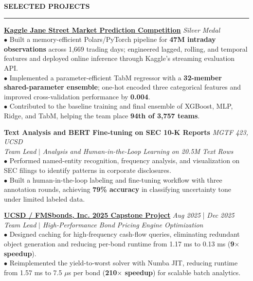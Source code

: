 \documentclass{../original_CV/resume}
\renewcommand{\sectionskip}{\vspace{0.10cm}}
\renewcommand{\sectionlineskip}{\vspace{0.10cm}}
\renewenvironment{rSection}[1]{
\sectionskip
\textcolor{UC San Diego Blue}{\textbf{\large\bfseries\MakeUppercase{#1}}}
\sectionlineskip
\hrule
\begin{list}{}{
\setlength{\leftmargin}{0em}
}
\item[]
}{
\end{list}
}
\begin{document}
\begin{rSection}{SELECTED PROJECTS}
\noindent
\href{https://github.com/YuankaiTao-super/Kaggle2024-Jane-Street-Real-Time-Market-Data-Forecasting}{\textbf{Kaggle Jane Street Market Prediction Competition}} \hfill \textit{Silver Medal}\\
$\bullet$ Built a memory-efficient Polars/PyTorch pipeline for \textbf{47M intraday observations} across 1,669 trading days; engineered lagged, rolling, and temporal features and deployed online inference through Kaggle's streaming evaluation API.\\[1.5pt]
$\bullet$ Implemented a parameter-efficient TabM regressor with a \textbf{32-member shared-parameter ensemble}; one-hot encoded three categorical features and improved cross-validation performance by \textbf{0.004}.\\[1.5pt]
$\bullet$ Contributed to the baseline training and final ensemble of XGBoost, MLP, Ridge, and TabM, helping the team place \textbf{94th of 3,757 teams}.

\noindent
\textbf{Text Analysis and BERT Fine-tuning on SEC 10-K Reports} \hfill \textit{MGTF 423, UCSD}\\
\textit{Team Lead} $|$ \textit{Analysis and Human-in-the-Loop Learning on 20.5M Text Rows}\\[4pt]
$\bullet$ Performed named-entity recognition, frequency analysis, and visualization on SEC filings to identify patterns in corporate disclosures.\\[1.5pt]
$\bullet$ Built a human-in-the-loop labeling and fine-tuning workflow with three annotation rounds, achieving \textbf{79\% accuracy} in classifying uncertainty tone under limited labeled data.

\noindent
\href{https://github.com/YuankaiTao-super/Capstone_FMS_2025}{\textbf{UCSD / FMSbonds, Inc. 2025 Capstone Project}} \hfill {\em Aug 2025} | {\em Dec 2025}\\
\textit{Team Lead} $|$ \textit{High-Performance Bond Pricing Engine Optimization}\\[4pt]
$\bullet$ Designed caching for high-frequency cash-flow queries, eliminating redundant object generation and reducing per-bond runtime from 1.17 ms to 0.13 ms (\textbf{9$\times$ speedup}).\\[1.5pt]
$\bullet$ Reimplemented the yield-to-worst solver with Numba JIT, reducing runtime from 1.57 ms to 7.5 $\mu$s per bond (\textbf{210$\times$ speedup}) for scalable batch analytics.
\end{rSection}
\end{document}
